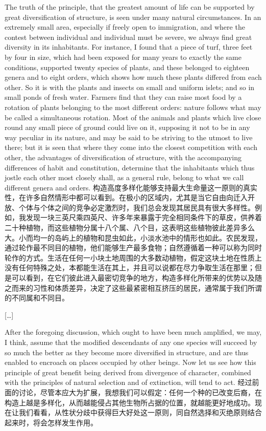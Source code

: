 \darwinpair
{The truth of the principle, that the greatest amount of life can be supported by great diversification of structure, is seen under many natural circumstances. In an extremely small area, especially if freely open to immigration, and where the contest between individual and individual must be severe, we always find great diversity in its inhabitants. For instance, I found that a piece of turf, three feet by four in size, which had been exposed for many years to exactly the same conditions, supported twenty species of plants, and these belonged to eighteen genera and to eight orders, which shows how much these plants differed from each other. So it is with the plants and insects on small and uniform islets; and so in small ponds of fresh water. Farmers find that they can raise most food by a rotation of plants belonging to the most different orders: nature follows what may be called a simultaneous rotation. Most of the animals and plants which live close round any small piece of ground could live on it, supposing it not to be in any way peculiar in its nature, and may be said to be striving to the utmost to live there; but it is seen that where they come into the closest competition with each other, the advantages of diversification of structure, with the accompanying differences of habit and constitution, determine that the inhabitants which thus jostle each other most closely shall, as a general rule, belong to what we call different genera and orders.}
{构造高度多样化能够支持最大生命量这一原则的真实性，在许多自然情形中都可以看到。在极小的区域内，尤其是当它自由向迁入开放、个体与个体之间的竞争必定激烈时，我们总会发现其居民具有很大多样性。例如，我发现一块三英尺乘四英尺、许多年来暴露于完全相同条件下的草皮，供养着二十种植物，而这些植物分属十八个属、八个目，这表明这些植物彼此差异多么大。小而均一的岛屿上的植物和昆虫如此，小淡水池中的情形也如此。农民发现，通过轮作最不同目的植物，他们能够生产最多食物；自然遵循着一种可以称为同时轮作的方式。生活在任何一小块土地周围的大多数动植物，假定这块土地在性质上没有任何特殊之处，本都能生活在其上，并且可以说都在尽力争取生活在那里；但是可以看到，在它们彼此进入最密切竞争的地方，构造多样化所带来的优势以及随之而来的习性和体质差异，决定了这些最紧密相互挤压的居民，通常属于我们所谓的不同属和不同目。}

\begin{center}
[\ldots]
\end{center}

\darwinpair
{After the foregoing discussion, which ought to have been much amplified, we may, I think, assume that the modified descendants of any one species will succeed by so much the better as they become more diversified in structure, and are thus enabled to encroach on places occupied by other beings. Now let us see how this principle of great benefit being derived from divergence of character, combined with the principles of natural selection and of extinction, will tend to act.}
{经过前面的讨论，尽管本应大为扩展，我想我们可以假定：任何一个种的已改变后裔，在构造上越是多样化，从而越能侵占其他生物所占据的位置，就越能更好地成功。现在让我们看看，从性状分歧中获得巨大好处这一原则，同自然选择和灭绝原则结合起来时，将会怎样发生作用。}

